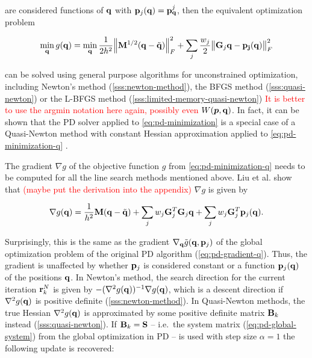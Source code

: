 \noindent are considered functions of $\mathbf{q}$ with $\mathbf{p}_j(\mathbf{q}) = \mathbf{p}^j_{\mathbf{q}}$, then the equivalent optimization problem

\begin{equation}\label{eq:pd-minimization-q}
    \min_{\mathbf{q}} g(\mathbf{q}) = 
    \min_{\mathbf{q}} \frac{1}{2h^2} \norm{\mathbf{M}^{1/2}(\mathbf{q} - \tilde{\mathbf{q}})}^2_F + \sum_j \frac{w_j}{2} \norm{\mathbf{G}_j\mathbf{q}
    - \mathbf{p_j}(\mathbf{q})}^2_F
\end{equation}

\noindent can be solved using general purpose algorithms for unconstrained optimization, including Newton's method (\cref{sss:newton-method}),
the BFGS method (\cref{sss:quasi-newton}) or the L-BFGS method (\cref{sss:limited-memory-quasi-newton}) \textcolor{red}{It is better to use the
argmin notation here again, possibly even $W(\bm{p}, \mathbf{q})$}. In fact, it can be shown that
the PD solver applied to \autoref{eq:pd-minimization} is a special case of a Quasi-Newton method with constant Hessian approximation 
applied to \autoref{eq:pd-minimization-q} \cite{liu2017}. 

The gradient $\nabla g$ of the objective function $g$ from \autoref{eq:pd-minimization-q} needs to be computed for all the line search 
methods mentioned above. Liu et al. \cite{liu2017} show that \textcolor{red}{(maybe put the derivation into the appendix)} $\nabla g$ 
is given by

\begin{equation}\label{eq:pd-gradient-qn}
    \nabla g(\mathbf{q}) = \frac{1}{h^2}\mathbf{M}(\mathbf{q} - \tilde{\mathbf{q}}) + \sum_j w_j \mathbf{G}^T_j \mathbf{G}_j \mathbf{q}
    + \sum_j w_j \mathbf{G}^T_j \mathbf{p}_j(\mathbf{q}).
\end{equation}

Surprisingly, this is the same as the gradient $\nabla_{\mathbf{q}} \tilde{g}(\mathbf{q}, \mathbf{p}_j)$ of the global optimization problem of the original
PD algorithm (\cref{eq:pd-gradient-q}). Thus, the gradient is unaffected by whether $\mathbf{p}_j$ is considered constant or a function
$\mathbf{p}_j(\mathbf{q})$ of the positions $\mathbf{q}$. In Newton's method, the search direction for the current iteration $\mathbf{r}^N_k$ is given
by $-(\nabla^2 g(\mathbf{q}))^{-1} \nabla g(\mathbf{q})$, which is a descent direction if $\nabla^2 g(\mathbf{q})$ is positive definite 
(\cref{sss:newton-method}). In Quasi-Newton methods, the true Hessian $\nabla^2 g(\mathbf{q})$ is approximated by some positive definite matrix $\mathbf{B}_k$ 
instead (\cref{sss:quasi-newton}). If $\mathbf{B}_k = \mathbf{S}$ -- i.e.\ the system matrix 
(\cref{eq:pd-global-system}) from the global optimization in PD -- is used with step size $\alpha = 1$ the following update is recovered:


